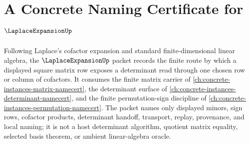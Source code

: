 \chapter{A Concrete Naming Certificate for $\LaplaceExpansionUp$}
\label{ch:concrete-instances-laplace-expansion-namecert}

Following Laplace's cofactor expansion and standard finite-dimensional linear algebra, the $\LaplaceExpansionUp$ packet records the finite route by which a displayed square matrix row exposes a determinant read through one chosen row or column of cofactors. It consumes the finite matrix carrier of \autoref{ch:concrete-instances-matrix-namecert}, the determinant surface of \autoref{ch:concrete-instances-determinant-namecert}, and the finite permutation-sign discipline of \autoref{ch:concrete-instances-permutation-namecert}. The packet names only displayed minors, sign rows, cofactor products, determinant handoff, transport, replay, provenance, and local naming; it is not a host determinant algorithm, quotient matrix equality, selected basis theorem, or ambient linear-algebra oracle.

